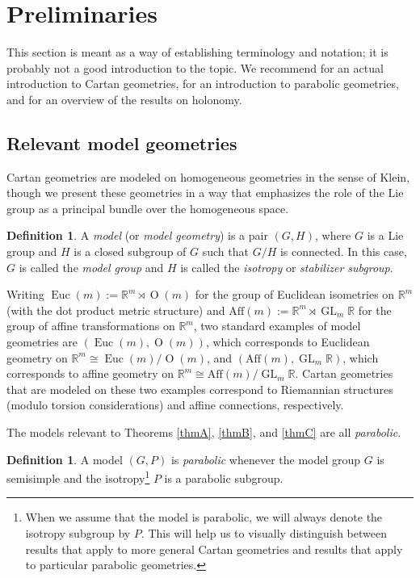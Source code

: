 \documentclass[pdftex]{sigma}
\numberwithin{equation}{section}
\theoremstyle{definition}
\newtheorem{Definition}[Theorem]{Definition}
\DeclareMathOperator{\Iso}{\mathrm{Euc}}
\DeclareMathOperator{\Orth}{\mathrm{O}}
\DeclareMathOperator{\GLin}{\mathrm{GL}}
\begin{document}
\section{Preliminaries}\label{preliminaries}
This section is meant as a way of establishing terminology and notation; it is probably not a good introduction to the topic. We recommend \cite{Sharpe1997} for an actual introduction to Cartan geometries, \cite{CapSlovakPG1} for an introduction to parabolic geometries, and \cite{HolonomyPaper} for an overview of the results on holonomy.

\subsection{Relevant model geometries}
Cartan geometries are modeled on homogeneous geometries in the sense of Klein, though we present these geometries in a way that emphasizes the role of the Lie group as a principal bundle over the homogeneous space.

\begin{Definition}A \emph{model} (or \emph{model geometry}) is a pair $(G,H)$, where $G$ is a Lie group and $H$ is a closed subgroup of $G$ such that $G/H$ is connected. In this case, $G$ is called the \emph{model group} and $H$ is called the \emph{isotropy} or \emph{stabilizer subgroup}.\end{Definition}

Writing $\Iso(m):=\mathbb{R}^m\rtimes\Orth(m)$ for the group of Euclidean isometries on $\mathbb{R}^m$ (with the dot product metric structure) and $\mathrm{Aff}(m):=\mathbb{R}^m\rtimes\GLin_m\mathbb{R}$ for the group of affine transformations on $\mathbb{R}^m$, two standard examples of model geometries are $(\Iso(m),\Orth(m))$, which corresponds to Euclidean geometry on $\mathbb{R}^m\cong\Iso(m)/\Orth(m)$, and $(\mathrm{Aff}(m),\GLin_m\mathbb{R})$, which corresponds to affine geometry on $\mathbb{R}^m\cong\mathrm{Aff}(m)/\GLin_m\mathbb{R}$. Cartan geometries that are modeled on these two examples correspond to Riemannian structures (modulo torsion considerations) and affine connections, respectively.

The models relevant to Theorems \ref{thmA}, \ref{thmB}, and \ref{thmC} are all \emph{parabolic}.

\begin{Definition}A model $(G,P)$ is \emph{parabolic} whenever the model group $G$ is semisimple and the isotropy\footnote{When we assume that the model is parabolic, we will always denote the isotropy subgroup by $P$. This will help us to visually distinguish between results that apply to more general Cartan geometries and results that apply to particular parabolic geometries.} $P$ is a parabolic subgroup.\end{Definition}
\end{document}
